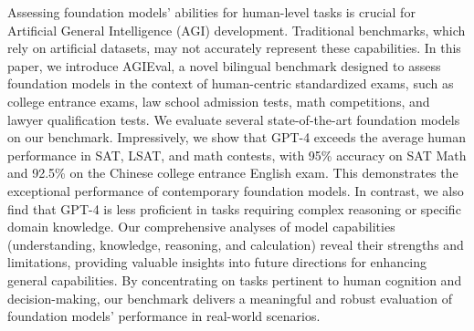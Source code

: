 Assessing foundation models' abilities for human-level tasks is crucial for Artificial General Intelligence (AGI) development. Traditional benchmarks, which rely on artificial datasets, may not accurately represent these capabilities. In this paper, we introduce AGIEval, a novel bilingual benchmark designed to assess foundation models in the context of human-centric standardized exams, such as college entrance exams, law school admission tests, math competitions, and lawyer qualification tests.  We evaluate several state-of-the-art foundation models on our benchmark.  Impressively, we show that GPT-4 exceeds the average human performance in SAT, LSAT, and math contests, with 95\% accuracy on SAT Math and 92.5\% on the Chinese college entrance English exam. This demonstrates the exceptional performance of contemporary foundation models.  In contrast, we also find that GPT-4 is less proficient in tasks requiring complex reasoning or specific domain knowledge. Our comprehensive analyses of model capabilities (understanding, knowledge, reasoning, and calculation) reveal their strengths and limitations, providing valuable insights into future directions for enhancing general capabilities. By concentrating on tasks pertinent to human cognition and decision-making, our benchmark delivers a meaningful and robust evaluation of foundation models' performance in real-world scenarios.